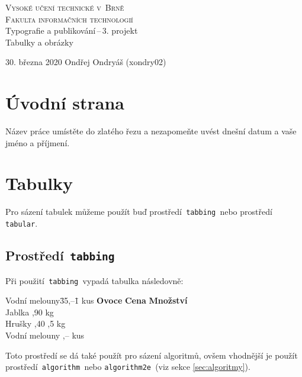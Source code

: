 \documentclass[11pt]{article}
\begin{document}
\begin{titlepage}
\begin{center}
\Huge\textsc{Vysoké učení technické v~Brně}\\\huge\textsc{Fakulta informačních technologií}\\
\LARGE
Typografie a publikování\,--\,3. projekt\\
\Huge
Tabulky a obrázky\\
\end{center}
{\Large 30. března 2020 \hfill Ondřej Ondryáš (xondry02)}
\end{titlepage}

\section{Úvodní strana}
Název práce umístěte do zlatého řezu a nezapomeňte uvést dnešní datum a vaše jméno a příjmení.

\section{Tabulky}
Pro sázení tabulek můžeme použít buď prostředí\verb| tabbing |nebo prostředí\verb| tabular|.

\subsection{Prostředí\texttt{ tabbing}}
Při použití\verb| tabbing |vypadá tabulka následovně:

\begin{tabbing}
Vodní melouny\quad\= 35,--\qquad \= 1 kus \kill
\textbf{Ovoce} \> \textbf{Cena} \> \textbf{Množství} \\
Jablka ,90  kg \\
Hrušky ,40 ,5 kg \\
Vodní melouny ,--  kus \\
\end{tabbing}

\noindent Toto prostředí se dá také použít pro sázení algoritmů, ovšem vhodnější je použít prostředí\texttt{ algorithm }nebo \texttt{algorithm2e }(viz sekce \ref{sec:algoritmy}).
\end{document}
